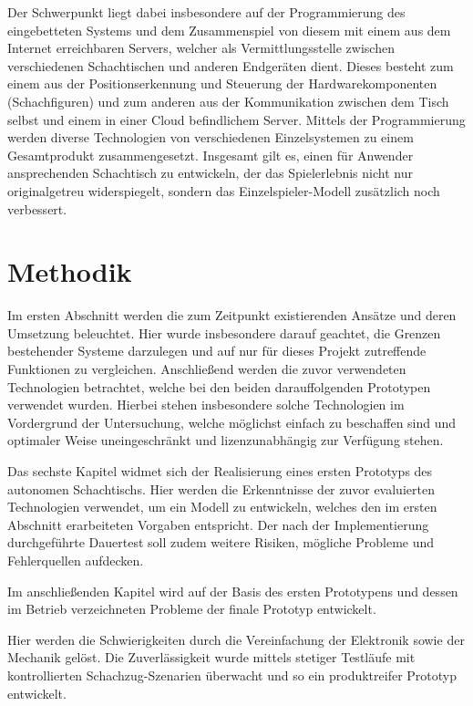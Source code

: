 Der Schwerpunkt liegt dabei insbesondere auf der Programmierung des
eingebetteten Systems und dem Zusammenspiel von diesem mit einem aus dem
Internet erreichbaren Servers, welcher als Vermittlungsstelle zwischen
verschiedenen Schachtischen und anderen Endgeräten dient. Dieses besteht
zum einem aus der Positionserkennung und Steuerung der
Hardwarekomponenten (Schachfiguren) und zum anderen aus der
Kommunikation zwischen dem Tisch selbst und einem in einer Cloud
befindlichem Server. Mittels der Programmierung werden diverse
Technologien von verschiedenen Einzelsystemen zu einem Gesamtprodukt
zusammengesetzt. Insgesamt gilt es, einen für Anwender ansprechenden
Schachtisch zu entwickeln, der das Spielerlebnis nicht nur
originalgetreu widerspiegelt, sondern das Einzelspieler-Modell
zusätzlich noch verbessert.

\hypertarget{methodik}{%
\section{Methodik}\label{methodik}}

Im ersten Abschnitt werden die zum Zeitpunkt existierenden Ansätze und
deren Umsetzung beleuchtet. Hier wurde insbesondere darauf geachtet, die
Grenzen bestehender Systeme darzulegen und auf nur für dieses Projekt
zutreffende Funktionen zu vergleichen. Anschließend werden die zuvor
verwendeten Technologien betrachtet, welche bei den beiden
darauffolgenden Prototypen verwendet wurden. Hierbei stehen insbesondere
solche Technologien im Vordergrund der Untersuchung, welche möglichst
einfach zu beschaffen sind und optimaler Weise uneingeschränkt und
lizenzunabhängig zur Verfügung stehen.

Das sechste Kapitel widmet sich der Realisierung eines ersten Prototyps
des autonomen Schachtischs. Hier werden die Erkenntnisse der zuvor
evaluierten Technologien verwendet, um ein Modell zu entwickeln, welches
den im ersten Abschnitt erarbeiteten Vorgaben entspricht. Der nach der
Implementierung durchgeführte Dauertest soll zudem weitere Risiken,
mögliche Probleme und Fehlerquellen aufdecken.

Im anschließenden Kapitel wird auf der Basis des ersten Prototypens und
dessen im Betrieb verzeichneten Probleme der finale Prototyp entwickelt.

Hier werden die Schwierigkeiten durch die Vereinfachung der Elektronik
sowie der Mechanik gelöst. Die Zuverlässigkeit wurde mittels stetiger
Testläufe mit kontrollierten Schachzug-Szenarien überwacht und so ein
produktreifer Prototyp entwickelt.


